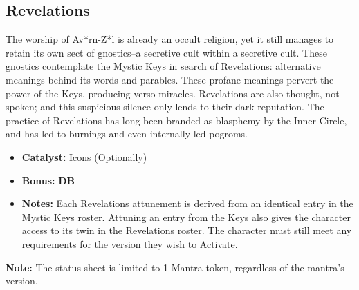 \subsection{Revelations}
The worship of Av*rn-Z*l is already an occult religion, yet it still manages to retain its own sect of gnostics--a secretive cult within a secretive cult. These gnostics contemplate the Mystic Keys in search of Revelations: alternative meanings behind its words and parables. These profane meanings pervert the power of the Keys, producing verso-miracles. Revelations are also thought, not spoken; and this suspicious silence only lends to their dark reputation. The practice of Revelations has long been branded as blasphemy by the Inner Circle, and has led to burnings and even internally-led pogroms.

\begin{itemize}
\item \textbf{Catalyst:} Icons (Optionally)
\item \textbf{Bonus:} \textbf{DB}
\item \textbf{Notes:} Each Revelations attunement is derived from an identical entry in the Mystic Keys roster. Attuning an entry from the Keys also gives the character access to its twin in the Revelations roster. The character must still meet any requirements for the version they wish to Activate.
\end{itemize}

\begin{tcolorbox}
\textbf{Note:} The status sheet is limited to 1 Mantra token, regardless of the mantra’s version.
\end{tcolorbox}

